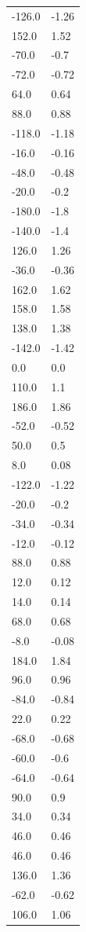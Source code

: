 \begin{longtable}{ll}
-126.0 & -1.26 \\
152.0 & 1.52 \\
-70.0 & -0.7 \\
-72.0 & -0.72 \\
64.0 & 0.64 \\
88.0 & 0.88 \\
-118.0 & -1.18 \\
-16.0 & -0.16 \\
-48.0 & -0.48 \\
-20.0 & -0.2 \\
-180.0 & -1.8 \\
-140.0 & -1.4 \\
126.0 & 1.26 \\
-36.0 & -0.36 \\
162.0 & 1.62 \\
158.0 & 1.58 \\
138.0 & 1.38 \\
-142.0 & -1.42 \\
0.0 & 0.0 \\
110.0 & 1.1 \\
186.0 & 1.86 \\
-52.0 & -0.52 \\
50.0 & 0.5 \\
8.0 & 0.08 \\
-122.0 & -1.22 \\
-20.0 & -0.2 \\
-34.0 & -0.34 \\
-12.0 & -0.12 \\
88.0 & 0.88 \\
12.0 & 0.12 \\
14.0 & 0.14 \\
68.0 & 0.68 \\
-8.0 & -0.08 \\
184.0 & 1.84 \\
96.0 & 0.96 \\
-84.0 & -0.84 \\
22.0 & 0.22 \\
-68.0 & -0.68 \\
-60.0 & -0.6 \\
-64.0 & -0.64 \\
90.0 & 0.9 \\
34.0 & 0.34 \\
46.0 & 0.46 \\
46.0 & 0.46 \\
136.0 & 1.36 \\
-62.0 & -0.62 \\
106.0 & 1.06 \\

\end{longtable}
